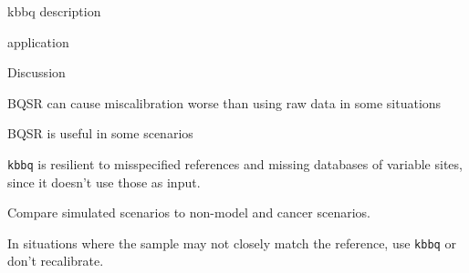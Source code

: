 \documentclass{article}
\begin{document}
\begin{outline}
\begin{outline}
		\item kbbq description
		\item application
	\end{outline}
	\item Discussion
	\begin{outline}
		\item BQSR can cause miscalibration worse than using raw data in some situations
		\item BQSR is useful in some scenarios
		\item \texttt{kbbq} is resilient to misspecified references and missing databases of variable sites, since it doesn't use those as input.
		\item Compare simulated scenarios to non-model and cancer scenarios.
		\begin{outline}
			\item In situations where the sample may not closely match the reference, use \texttt{kbbq} or don't recalibrate.
		\end{outline}
	\end{outline}
\end{outline}
\end{document}
